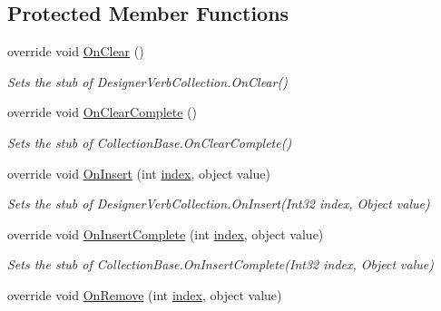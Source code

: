 \subsection*{Protected Member Functions}
\begin{DoxyCompactItemize}
\item 
override void \hyperlink{class_system_1_1_component_model_1_1_design_1_1_fakes_1_1_stub_designer_verb_collection_a0448c02408372fd31fe000074b22b2ed}{On\-Clear} ()
\begin{DoxyCompactList}\small\item\em Sets the stub of Designer\-Verb\-Collection.\-On\-Clear()\end{DoxyCompactList}\item 
override void \hyperlink{class_system_1_1_component_model_1_1_design_1_1_fakes_1_1_stub_designer_verb_collection_a9e844c5249674aa2ced54e2ff020c16a}{On\-Clear\-Complete} ()
\begin{DoxyCompactList}\small\item\em Sets the stub of Collection\-Base.\-On\-Clear\-Complete()\end{DoxyCompactList}\item 
override void \hyperlink{class_system_1_1_component_model_1_1_design_1_1_fakes_1_1_stub_designer_verb_collection_ab34e3dac0025c699c74d9f4c6292404c}{On\-Insert} (int \hyperlink{jquery-1_810_82-vsdoc_8js_a75bb12d1f23302a9eea93a6d89d0193e}{index}, object value)
\begin{DoxyCompactList}\small\item\em Sets the stub of Designer\-Verb\-Collection.\-On\-Insert(\-Int32 index, Object value)\end{DoxyCompactList}\item 
override void \hyperlink{class_system_1_1_component_model_1_1_design_1_1_fakes_1_1_stub_designer_verb_collection_a82cdfa9044a2a1a9e89acf747d9126be}{On\-Insert\-Complete} (int \hyperlink{jquery-1_810_82-vsdoc_8js_a75bb12d1f23302a9eea93a6d89d0193e}{index}, object value)
\begin{DoxyCompactList}\small\item\em Sets the stub of Collection\-Base.\-On\-Insert\-Complete(\-Int32 index, Object value)\end{DoxyCompactList}\item 
override void \hyperlink{class_system_1_1_component_model_1_1_design_1_1_fakes_1_1_stub_designer_verb_collection_a44ab33f5d15daa9135a4c8b9e09548be}{On\-Remove} (int \hyperlink{jquery-1_810_82-vsdoc_8js_a75bb12d1f23302a9eea93a6d89d0193e}{index}, object value)

\end{DoxyCompactItemize}
